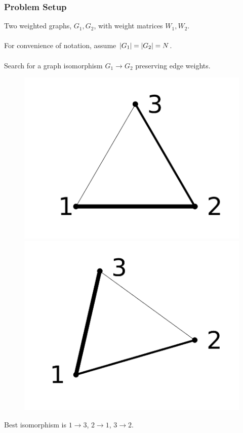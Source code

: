 \documentclass{beamer}
\begin{document}
\begin{frame}
  \frametitle{Problem Setup}
  Two weighted graphs, $G_1,G_2$, with weight matrices $W_1,W_2$.\\~\\
  For convenience of notation, assume $\left\lvert G_1\right\rvert = \left\lvert G_2\right\rvert = N$.\\~\\
  Search for a graph isomorphism $G_1\to G_2$ preserving edge weights.
  \begin{figure}[ht]
    \centering
    \begin{minipage}[b]{0.40\linewidth}
      \centering
      \includegraphics[width=\textwidth]{./Images/GraphMatch/isom1.png}
    \end{minipage}
    \begin{minipage}[b]{0.40\linewidth}
      \centering
      \includegraphics[width=\textwidth]{./Images/GraphMatch/isom2.png}
    \end{minipage}
  \end{figure}
  Best isomorphism is $1 \to 3$, $2 \to 1$, $3 \to 2$.
\end{frame}
\end{document}
